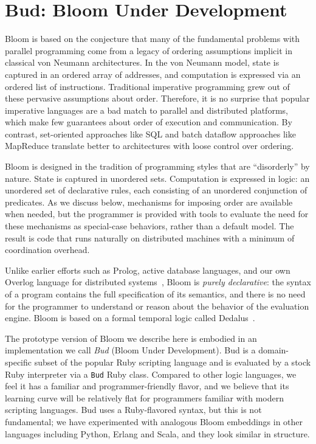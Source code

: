 \section{Bud: Bloom Under Development}
\label{sec:lang}
Bloom is based on the conjecture that many of the fundamental problems with
parallel programming come from a legacy of ordering assumptions implicit in classical von
Neumann architectures.  In the von Neumann model, state is captured in an
ordered array of addresses, and computation is expressed via an ordered list of
instructions.  Traditional imperative programming grew out of these pervasive
assumptions about order.  Therefore, it is no surprise that popular imperative
languages are a bad match to parallel and distributed platforms, which make few
guarantees about order of execution and communication. By contrast, set-oriented
approaches like SQL and batch dataflow approaches like MapReduce translate
better to architectures with loose control over ordering.

Bloom is designed in the tradition of programming styles that are ``disorderly''
by nature.  State is captured in unordered sets.  Computation is expressed
in logic: an unordered set of declarative rules, each consisting of an unordered
conjunction of predicates.  As we discuss below, mechanisms for imposing order are
available when needed, but the programmer is provided with tools to evaluate the
need for these mechanisms as special-case behaviors, rather than a default
model.  The result is code that runs naturally on distributed machines with a
minimum of coordination overhead.
 
Unlike earlier efforts such as Prolog, active database languages, and our own
Overlog language for distributed systems~\cite{p2}, Bloom is {\em purely
  declarative}: the syntax of a program contains the full specification of its
semantics, and there is no need for the programmer to understand or reason about
the behavior of the evaluation engine.  Bloom is based on a formal temporal
logic called Dedalus~\cite{dedalus}.

The prototype version of Bloom we describe here is embodied in an implementation
we call {\em Bud} (Bloom Under Development).  Bud is a domain-specific subset of
the popular Ruby scripting language and is evaluated by a stock Ruby interpreter
via a \texttt{Bud} Ruby class.  Compared to other logic languages, we feel it
has a familiar and programmer-friendly flavor, and we believe that its learning
curve will be relatively flat for programmers familiar with modern scripting
languages.  Bud uses a Ruby-flavored syntax, but this is not fundamental; we
have experimented with analogous Bloom embeddings in other languages including
Python, Erlang and Scala, and they look similar in structure.

